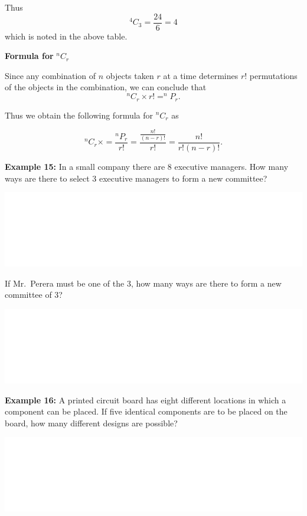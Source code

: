 \documentclass[]{book}
\begin{document}
Thus
\[^4C_3 = \frac{24}{6} = 4\]
which is noted in the above table.

\textbf{Formula for} \(^nC_r\)

Since any combination of \(n\) objects taken \(r\) at a time determines \(r!\) permutations of the objects in the combination, we can conclude that
\[^nC_r\times r! = ^nP_r.\]

Thus we obtain the following formula for \(^nC_r\) as

\[^nC_r\times = \frac{^nP_r}{r!} = \frac{\frac{n!}{(n-r)!}}{r!} = \frac{n!}{r!(n-r)!}.\]

\textbf{Example 15:} In a small company there are 8 executive managers. How many ways are there to select 3 executive managers to form a new committee?

\begin{center}\includegraphics[width=1\linewidth]{figure/box891-1} \end{center}

If Mr.~Perera must be one of the 3, how many ways are there to form a new committee of 3?

\begin{center}\includegraphics[width=1\linewidth]{figure/box891a-1} \end{center}

\textbf{Example 16:} A printed circuit board has eight different locations in which a component can be placed. If five identical components are to be placed on the board, how many different designs are possible?

\begin{center}\includegraphics[width=1\linewidth]{figure/box892-1} \end{center}
\end{document}
